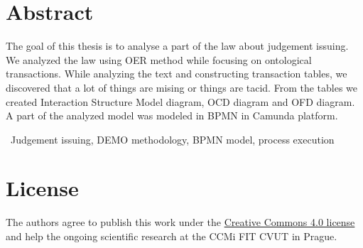 \section*{Abstract}

The goal of this thesis is to analyse a part of the law about judgement issuing. We analyzed the law using OER method while focusing on ontological transactions. While analyzing the text and constructing transaction tables, we discovered that a lot of things are mising or things are tacid. From the tables we created Interaction Structure Model diagram, OCD diagram and OFD diagram. A part of the analyzed model was modeled in BPMN in Camunda platform.

\bigskip


~Judgement issuing, DEMO methodology, BPMN model, process execution

\vfill

\section*{License}
The authors agree to publish this work under the \href{https://creativecommons.org/licenses/by/4.0/}{Creative Commons 4.0 license} and help the ongoing scientific research at the CCMi FIT CVUT in Prague. 
